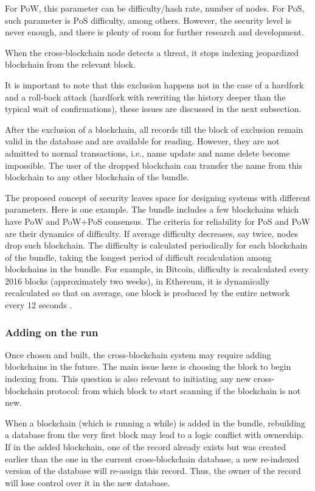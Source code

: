 \begin{multicols}{2}
For PoW, this parameter can be difficulty/hash rate, number of nodes. For PoS, such parameter is PoS difficulty, among others. However, the security level is never enough, and there is plenty of room for further research and development.

When the cross-blockchain node detects a threat, it stops indexing jeopardized blockchain from the relevant block.

It is important to note that this exclusion happens not in the case of a hardfork and a roll-back attack (hardfork with rewriting the history deeper than the typical wait of confirmations), these issues are discussed in the next subsection.

After the exclusion of a blockchain, all records till the block of exclusion remain valid in the database and are available for reading. However, they are not admitted to normal transactions, i.e., name update and name delete become impossible. The user of the dropped blockchain can transfer the name from this blockchain to any other blockchain of the bundle.

The proposed concept of security leaves space for designing systems with different parameters. Here is one example. The bundle includes a few blockchains which have PoW and PoW+PoS consensus. The criteria for reliability for PoS and PoW are their dynamics of difficulty. If average difficulty decreases, say twice, nodes drop such blockchain. The difficulty is calculated periodically for each blockchain of the bundle, taking the longest period of difficult recalculation among blockchains in the bundle. For example, in Bitcoin, difficulty is recalculated every 2016 blocks (approximately two weeks), in Ethereum, it is dynamically recalculated so that on average, one block is produced by the entire network every 12 seconds \cite{art1-key34}.

\subsubsection{Adding on the run}\label{subsubsec-4.2.4}

Once chosen and built, the cross-blockchain system may require adding blockchains in the future. The main issue here is choosing the block to begin indexing from. This question is also relevant to initiating any new cross-blockchain protocol: from which block to start scanning if the blockchain is not new.

When a blockchain (which is running a while) is added in the bundle, rebuilding a database from the very first block may lead to a logic conflict with ownership. If in the added blockchain, one of the record already exists but was created earlier than the one in the current cross-blockchain database, a new re-indexed version of the database will re-assign this record. Thus, the owner of the record will lose control over it in the new database.


\end{multicols}
